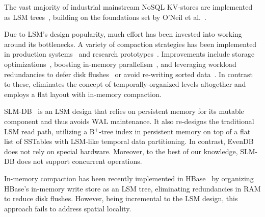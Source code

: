 

The vast majority of industrial mainstream NoSQL KV-stores are  implemented as LSM trees~\cite{hbase, 
RocksDB, scylladb, Bigtable2008, cassandra2010}, building on the foundations set by O'Neil 
et al.~\cite{DBLP:journals/acta/ONeilCGO96, Muth1998}. 

Due to LSM's design popularity, much effort has been invested into working around its bottlenecks.
A variety of compaction strategies has been implemented in production systems~\cite{CallaghanCompaction, 
ScyllaCompaction} and research prototypes~\cite{triad, PebblesDB, vttrees, slmdb}.  Improvements
 include storage
optimizations~\cite{WiscKey, PebblesDB, vttrees, slmdb,Papagiannis:2018:EMK:3267809.3267824}, 
boosting  in-memory parallelism~\cite{scylladb, clsm2015}, and leveraging 
 workload redundancies to defer disk flushes~\cite{triad, accordion} or avoid re-writing sorted data~\cite{vttrees}. 
In contrast to these, \sys\/ eliminates the concept of temporally-organized levels altogether
and employs a flat  layout with in-memory compaction.


SLM-DB~\cite{slmdb} is an LSM design that relies on persistent memory for its mutable component and thus avoids WAL maintenance. It also re-designs the traditional LSM read path, utilizing a 
 B$^+$-tree index in persistent memory on top of a flat list of SSTables with LSM-like temporal data partitioning. In contrast, EvenDB does not rely on special hardware. 
 Moreover, to the best of our knowledge, SLM-DB does not support concurrent operations.

In-memory compaction has been recently implemented in HBase~\cite{accordion} by organizing
HBase's in-memory write store  as an LSM tree, eliminating redundancies 
in RAM to reduce disk flushes. However, being incremental to the LSM design, 
this approach fails to address spatial locality. 

